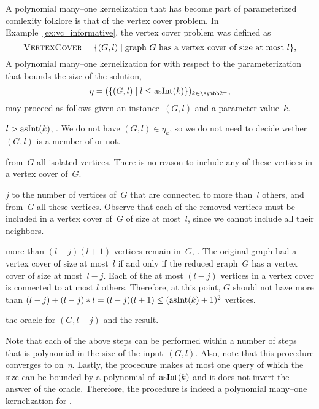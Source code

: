 \begin{example}
\label{ex:vertexcover}%
  A polynomial many--one kernelization that has become part of parameterized comlexity folklore is that of the vertex cover problem.
  In Example~\ref{ex:vc_informative}, the vertex cover problem was defined as
  \begin{equation*}
    \textnormal{\textsc{VertexCover}} = \{(G, l) \;|\; \text{graph $G$ has a vertex cover of size at most $l$}\},
  \end{equation*}
  A polynomial many--one kernelization for  with respect to the parameterization that bounds the size of the solution,
  \begin{equation*}
    \eta \deq (\{(G, l) \st l \le \asNat(k)\})_{k \in \binary^+},
  \end{equation*}
  may proceed as follows given an instance~$(G, l)$ and a parameter value~$k$.
  \begin{codelisting}
  \item
     $l > \asNat(k)$,  .
    We do not have $(G, l) \in \eta_k$, so we do not need to decide wether $(G, l)$ is a member of  or not.
  \item
     from~$G$ all isolated vertices.
    There is no reason to include any of these vertices in a vertex cover of~$G$.
  \item
     $j$ to the number of vertices of~$G$ that are connected to more than~$l$ others, and  from~$G$ all these vertices.
    Observe that each of the removed vertices must be included in a vertex cover of~$G$ of size at most~$l$, since we cannot include all their neighbors.
  \item
     more than $(l - j)(l + 1)$ vertices remain in~$G$,  .
    The original graph had a vertex cover of size at most~$l$ if and only if the reduced graph~$G$ has a vertex cover of size at most~$l - j$.
    Each of the at most $(l - j)$ vertices in a vertex cover is connected to at most $l$ others.
    Therefore, at this point, $G$ should not have more than $(l - j) + (l - j)* l = (l - j)(l + 1) \le (\asNat(k) + 1)^2$ vertices.
  \item
     the oracle for $(G, l - j)$ and  the result.
  \end{codelisting}

  Note that each of the above steps can be performed within a number of steps that is polynomial in the size of the input~$(G, l)$.
  Also, note that this procedure converges to  on~$\eta$.
  Lastly, the procedure makes at most one query of which the size can be bounded by a polynomial of~$\operatorname{asInt}(k)$ and it does not invert the answer of the oracle.
  Therefore, the procedure is indeed a polynomial many--one kernelization for .
\end{example}

